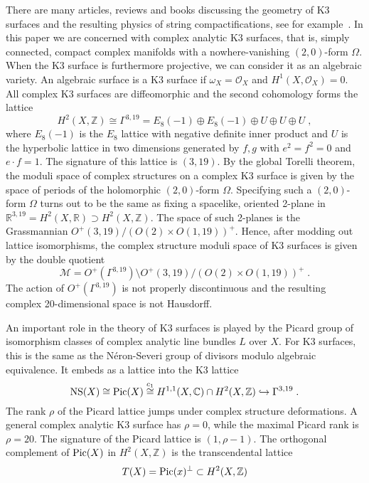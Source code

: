 \documentclass[11pt,a4paper]{article}
\numberwithin{equation}{section}
\numberwithin{table}{section}\setlength{\multlinegap}{25pt}
\begin{document}
There are many articles, reviews and books discussing the geometry of K3 surfaces and the resulting physics of string compactifications, see for example~\cite{Huybrechts:2016uxh,debarre2020hyperkahler,Aspinwall:1996mn,Braun:2016sks,Enoki:2019deb}. In this paper we are concerned with complex analytic K3 surfaces, that is, simply connected, compact complex manifolds with a nowhere-vanishing $(2,0)$-form $\Omega$. When the K3 surface is furthermore projective, we can consider it as an algebraic variety. An algebraic surface is a K3 surface if $\omega_X=\mathcal{O}_X$ and $H^1(X,\mathcal{O}_X)=0$. All complex K3 surfaces are diffeomorphic and the second cohomology forms the lattice
\begin{equation}
	H^2(X,\mathbb{Z})\cong \Gamma^{3,19} = E_8(-1)\oplus E_8(-1) \oplus U \oplus U \oplus U\;,
\end{equation}
where $E_8(-1)$ is the $E_8$ lattice with negative definite inner product and $U$ is the hyperbolic lattice in two dimensions generated by $f,g$ with $e^2=f^2=0$ and $e\cdot f=1$. The signature of this lattice is $(3,19)$. By the global Torelli theorem, the moduli space of complex structures on a complex K3 surface is given by the space of periods of the holomorphic $(2,0)$-form $\Omega$. Specifying such a $(2,0)$-form $\Omega$ turns out to be the same as fixing a spacelike, oriented 2-plane in $\mathbb{R}^{3,19}=H^2(X,\mathbb{R})\supset H^2(X,\mathbb{Z})$. The space of such 2-planes is the Grassmannian $O^+(3,19)/(O(2)\times O(1,19))^+$. Hence, after modding out lattice isomorphisms, the complex structure moduli space of K3 surfaces is given by the double quotient
\begin{equation}
	\mathcal{M}= O^+(\Gamma^{3,19})\!\setminus\! O^+(3,19)/(O(2)\times O(1,19))^+\;.
\end{equation}
The action of $O^+(\Gamma^{3,19})$ is not properly discontinuous and the resulting complex 20-dimensional space is not Hausdorff.

An important role in the theory of K3 surfaces is played by the Picard group of isomorphism classes of complex analytic line bundles $L$ over $X$. For K3 surfaces, this is the same as the Néron-Severi group of divisors modulo algebraic equivalence. It embeds as a lattice into the K3 lattice
\begin{equation}
	\textup{NS}(X)\cong \textup{Pic}(X)\overset{c_1}{\cong}H^{1,1}(X,\mathbb{C})\cap H^2(X,\mathbb{Z})\hookrightarrow \Gamma^{3,19}\;.
\end{equation}
The rank $\rho$ of the Picard lattice jumps under complex structure deformations. A general complex analytic K3 surface has $\rho=0$, while the maximal Picard rank is $\rho=20$. The signature of the Picard lattice is $(1,\rho-1)$. The orthogonal complement of $\textup{Pic}(X)$ in $H^2(X,\mathbb{Z})$ is the transcendental lattice
\begin{equation}
	T(X)=\textup{Pic}(x)^\perp\subset H^2(X,\mathbb{Z})
\end{equation}
\end{document}
